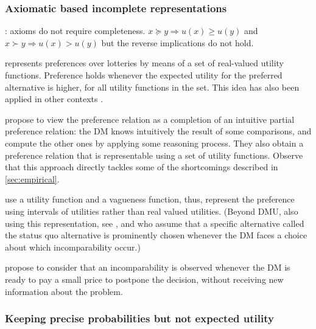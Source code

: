 \documentclass[french, english]{llncs}
\begin{document}
	\subsubsection{Axiomatic based incomplete representations}
	\citet{aumann_1962}: axioms do not require completeness. $x \succeq y ⇒ u(x) ≥ u(y)$ and $x \succ y ⇒ u(x) > u(y)$ but the reverse implications do not hold.

	\citet{dubra_expected_2004} represents preferences over lotteries by means of a set of real-valued utility functions. Preference holds whenever the expected utility for the preferred alternative is higher, for all utility functions in the set. This idea has also been applied in other contexts \citep{ok_2002, eliaz_indifference_2006}.
	
	\citet{dubra_model_2002} propose to view the preference relation as a completion of an intuitive partial preference relation: the \ac{DM} knows intuitively the result of some comparisons, and compute the other ones by applying some reasoning process. They also obtain a preference relation that is representable using a set of utility functions. Observe that this approach directly tackles some of the shortcomings described in \cref{sec:empirical}.
	
	\citet{manzini_representation_2007} use a utility function and a vagueness function, thus, represent the preference using intervals of utilities rather than real valued utilities. (Beyond DMU, also using this representation, see \citet{manzini_vague_2003}, and \citet{masatlioglu_2005} who assume that a specific alternative called the status quo alternative is prominently chosen whenever the \ac{DM} faces a choice about which incomparability occur.)
	
	\citet{danan} propose to consider that an incomparability is observed whenever the \ac{DM} is ready to pay a small price to postpone the decision, without receiving new information about the problem.
	
	\subsubsection{Keeping precise probabilities but not expected utility}
	
\end{document}
